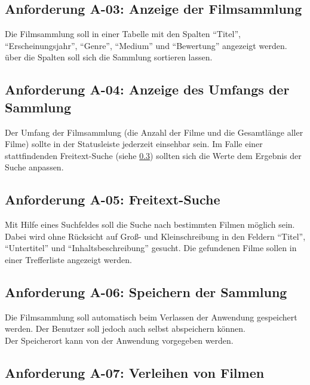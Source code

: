 \documentclass[oneside,german,oneside]{scrbook}
\begin{document}
    \subsection{Anforderung A-03: Anzeige der Filmsammlung}\label{anf:03}

        Die Filmsammlung soll in einer Tabelle mit den Spalten ``Titel'',
        ``Erscheinungsjahr'', ``Genre'', ``Medium'' und ``Bewertung'' angezeigt
        werden. \"uber die Spalten soll sich die Sammlung sortieren lassen.

    \subsection{Anforderung A-04: Anzeige des Umfangs der Sammlung}\label{anf:04}

        Der Umfang der Filmsammlung (die Anzahl der Filme und die Gesamtl\"ange
        aller Filme) sollte in der Statusleiste jederzeit einsehbar sein. Im
        Falle einer stattfindenden Freitext-Suche (siehe \ref{anf:05}) sollten
        sich die Werte dem Ergebnis der Suche anpassen.

    \subsection{Anforderung A-05: Freitext-Suche}\label{anf:05}

        Mit Hilfe eines Suchfeldes soll die Suche nach bestimmten Filmen m\"oglich
        sein. Dabei wird ohne R\"ucksicht auf Gro{\ss}- und Kleinschreibung in den
        Feldern ``Titel'', ``Untertitel'' und ``Inhaltsbeschreibung'' gesucht.
        Die gefundenen Filme sollen in einer Trefferliste angezeigt werden.

    \subsection{Anforderung A-06: Speichern der Sammlung}\label{anf:06}

        Die Filmsammlung soll automatisch beim Verlassen der Anwendung
        gespeichert werden. Der Benutzer soll jedoch auch selbst abspeichern
        k\"onnen. \\
        Der Speicherort kann von der Anwendung vorgegeben werden.

    \subsection{Anforderung A-07: Verleihen von Filmen}\label{anf:07}
\end{document}
